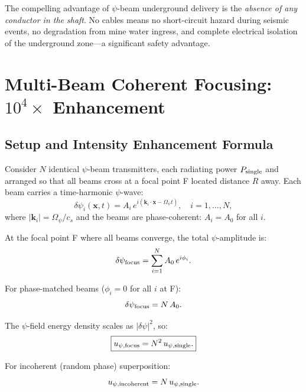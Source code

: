 \documentclass[aps,prd,twocolumn,superscriptaddress]{revtex4-2}
\begin{document}
The compelling advantage of $\psi$-beam underground delivery is the
\emph{absence of any conductor in the shaft}.  No cables means no
short-circuit hazard during seismic events, no degradation from mine
water ingress, and complete electrical isolation of the underground
zone---a significant safety advantage.

\section{Multi-Beam Coherent Focusing: $10^4\times$ Enhancement}
\label{sec:multibeam}

\subsection{Setup and Intensity Enhancement Formula}

Consider $N$ identical $\psi$-beam transmitters, each radiating power
$P_{\rm single}$ and arranged so that all beams cross at a focal point
F located distance $R$ away.  Each beam carries a time-harmonic $\psi$-wave:
\begin{equation}
\delta\psi_i(\mathbf{x},t) = A_i\,e^{i(\mathbf{k}_i\cdot\mathbf{x} - \Omega_\psi t)},
\quad i = 1,\ldots,N,
\label{eq:psi-beam}
\end{equation}
where $|\mathbf{k}_i| = \Omega_\psi/c_s$ and the beams are phase-coherent:
$A_i = A_0$ for all $i$.

At the focal point F where all beams converge, the total $\psi$-amplitude is:
\begin{equation}
\delta\psi_{\rm focus} = \sum_{i=1}^N A_0\,e^{i\phi_i}.
\label{eq:psi-focus}
\end{equation}

For phase-matched beams ($\phi_i = 0$ for all $i$ at F):
\begin{equation}
\delta\psi_{\rm focus} = N\,A_0.
\label{eq:psi-coherent}
\end{equation}

The $\psi$-field energy density scales as $|\delta\psi|^2$, so:
\begin{equation}
\boxed{
u_{\psi,\rm focus} = N^2\,u_{\psi,\rm single}.
}
\label{eq:intensity-enhancement}
\end{equation}

For incoherent (random phase) superposition:
\begin{equation}
u_{\psi,\rm incoherent} = N\,u_{\psi,\rm single}.
\label{eq:intensity-incoherent}
\end{equation}
\end{document}

